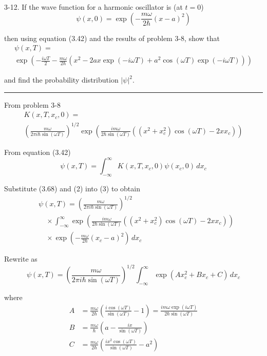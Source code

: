 \documentclass[12pt]{article}
\begin{document}
3-12.
If the wave function for a harmonic oscillator is (at $t=0$)
\begin{equation*}
\psi(x,0)=\exp\left(-\frac{m\omega}{2\hbar}(x-a)^2\right)
\tag{3.67}
\end{equation*}

then using equation (3.42) and the results of problem 3-8, show that
\begin{multline*}
\psi(x,T)=
\\
\exp\left(
-\frac{i\omega T}{2}-\frac{m\omega}{2\hbar}
\left(x^2-2ax\exp(-i\omega T)+a^2\cos(\omega T)\exp(-i\omega T)\right)
\right)
\tag{3.68}
\end{multline*}

and find the probability distribution $\vert\psi\vert^2$.

\bigskip
\hrule

\bigskip
From problem 3-8
\begin{multline*}
K(x,T,x_c,0)=
\\
\left(\frac{m\omega}{2\pi i\hbar\sin(\omega T)}\right)^{1/2}
\exp\left(
\frac{im\omega}{2\hbar\sin(\omega T)}\left((x^2+x_c^2)\cos(\omega T)-2xx_c\right)
\right)
\tag{2}
\end{multline*}

From equation (3.42)
\begin{equation*}
\psi(x,T)=\int_{-\infty}^\infty K(x,T,x_c,0)\psi(x_c,0)\,dx_c
\tag{3}
\end{equation*}

Substitute (3.68) and (2) into (3) to obtain
\begin{align*}
&\psi(x,T)=\left(\frac{m\omega}{2\pi i\hbar\sin(\omega T)}\right)^{1/2}
\\
&\quad{}\times\int_{-\infty}^\infty
\exp\left(
\frac{im\omega}{2\hbar\sin(\omega T)}\left((x^2+x_c^2)\cos(\omega T)-2xx_c\right)
\right)
\\
&\quad{}\times\exp\left(-\frac{m\omega}{2\hbar}(x_c-a)^2\right)\,dx_c
\end{align*}

Rewrite as
\begin{equation*}
\psi(x,T)=\left(\frac{m\omega}{2\pi i\hbar\sin(\omega T)}\right)^{1/2}
\int_{-\infty}^\infty\exp(Ax_c^2+Bx_c+C)\,dx_c
\tag{4}
\end{equation*}

where
\begin{align*}
A&=\frac{m\omega}{2\hbar}\left(\frac{i\cos(\omega T)}{\sin(\omega T)}-1\right)
=\frac{im\omega\exp(i\omega T)}{2\hbar\sin(\omega T)}
\\
B&=\frac{m\omega}{\hbar}\left(a-\frac{ix}{\sin(\omega T)}\right)
\\
C&=\frac{m\omega}{2\hbar}\left(\frac{ix^2\cos(\omega T)}{\sin(\omega T)}-a^2\right)
\end{align*}
\end{document}
